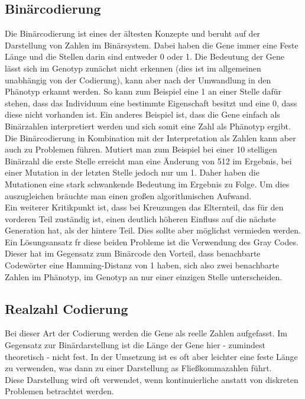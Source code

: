 \subsection{Binärcodierung}
Die Binärcodierung ist eines der ältesten Konzepte und beruht auf der Darstellung von Zahlen im Binärsystem. Dabei haben die Gene immer eine Feste Länge und die Stellen darin sind entweder 0 oder 1. Die Bedeutung der Gene lässt sich im Genotyp zunächst nicht erkennen (dies ist im allgemeinen unabhängig von der Codierung), kann aber nach der Umwandlung in den Phänotyp erkannt werden. So kann zum Beispiel eine 1 an einer Stelle dafür stehen, dass das Individuum eine bestimmte Eigenschaft besitzt und eine 0, dass diese nicht vorhanden ist. Ein anderes Beispiel ist, dass die Gene einfach als Binärzahlen interpretiert werden und sich somit eine Zahl als Phänotyp ergibt.\\

\noindent Die Binärcodierung in Kombination mit der Interpretation als Zahlen kann aber auch zu Problemen führen. Mutiert man zum Beispiel bei einer 10 stelligen Binärzahl die erste Stelle erreicht man eine Änderung von 512 im Ergebnis, bei einer Mutation in der letzten Stelle jedoch nur um 1. Daher haben die Mutationen eine stark schwankende Bedeutung im Ergebnis zu Folge. Um dies auszugleichen bräuchte man einen großen algorithmischen Aufwand.\\
Ein weiterer Kritikpunkt ist, dass bei Kreuzungen das Elternteil, das für den vorderen Teil zuständig ist, einen deutlich höheren Einfluss auf die nächste Generation hat, als der hintere Teil. Dies sollte aber möglichst vermieden werden.\\
Ein Lösungsansatz fr diese beiden Probleme ist die Verwendung des Gray Codes. Dieser hat im Gegensatz zum Binärcode den Vorteil, dass benachbarte Codewörter eine Hamming-Distanz von 1 haben, sich also zwei benachbarte Zahlen im Phänotyp, im Genotyp an nur einer einzigen Stelle unterscheiden.

\subsection{Realzahl Codierung}
Bei dieser Art der Codierung werden die Gene als reelle Zahlen aufgefasst. Im Gegensatz zur Binärdarstellung ist die Länge der Gene hier -  zumindest theoretisch - nicht fest. In der Umsetzung ist es oft aber leichter eine feste Länge zu verwenden, was dann zu einer Darstellung as Fließkommazahlen führt.\\
Diese Darstellung wird oft verwendet, wenn kontinuierliche anstatt von diskreten Problemen betrachtet werden.


